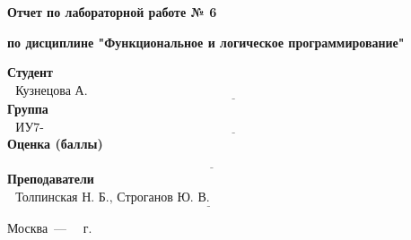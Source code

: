 \begin{titlepage}
	
	\begin{center}
		\Large\textbf{Отчет по лабораторной работе № 6}
		
		\Large\textbf {по дисциплине "Функциональное и логическое программирование"}
	\end{center}



	\noindent\newline\newline\newline
	

	\noindent\textbf{Студент} $\underline{\text{~~Кузнецова А. В.~~~~~~~~~~~~~~~~~~~~~~~~~~~~~~~~~~~~~~~~~~~~~~~~~~~~~~~~~~~~~~~~~~~~~~~~~~~~~~~~~~~~~~}}$\newline\newline
	\noindent\textbf{Группа} $\underline{\text{~~ИУ7-61Б~~~~~~~~~~~~~~~~~~~~~~~~~~~~~~~~~~~~~~~~~~~~~~~~~~~~~~~~~~~~~~~~~~~~~~~~~~~~~~~~~~~~~~~~~~~~~~~~~}}$\newline\newline
	\noindent\textbf{Оценка (баллы)} $\underline{\text{~~~~~~~~~~~~~~~~~~~~~~~~~~~~~~~~~~~~~~~~~~~~~~~~~~~~~~~~~~~~~~~~~~~~~~~~~~~~~~~~~~~~~~~~~~~~~~~~~~}}$\newline\newline
	\noindent\textbf{Преподаватели} $\underline{\text{~~Толпинская Н. Б., Строганов Ю. В.~~~~~~~~~~~~~~~~~~~~~~~~~~~~~~~~~~~~~~~~~~~~~~~~}}$\newline
	
	\begin{center}
		\vfill
		Москва~---~\the\year
		~г.
	\end{center}
	\restoregeometry
\end{titlepage}

